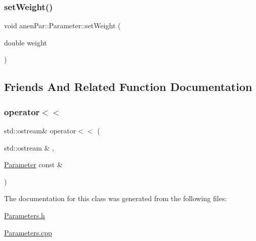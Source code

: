 \subsubsection{\texorpdfstring{set\+Weight()}{setWeight()}}
{\footnotesize\ttfamily void anen\+Par\+::\+Parameter\+::set\+Weight (\begin{DoxyParamCaption}\item[{double}]{weight }\end{DoxyParamCaption})}



\subsection{Friends And Related Function Documentation}
\mbox{\label{classanen_par_1_1_parameter_a062fa105b64c362071304bc5f2eb350a}} 
\subsubsection{\texorpdfstring{operator$<$$<$}{operator<<}}
{\footnotesize\ttfamily std\+::ostream\& operator$<$$<$ (\begin{DoxyParamCaption}\item[{std\+::ostream \&}]{,  }\item[{\mbox{\hyperlink{classanen_par_1_1_parameter}{Parameter}} const \&}]{ }\end{DoxyParamCaption})\hspace{0.3cm}{\ttfamily [friend]}}



The documentation for this class was generated from the following files\+:\begin{DoxyCompactItemize}
\item 
\mbox{\hyperlink{_parameters_8h}{Parameters.\+h}}\item 
\mbox{\hyperlink{_parameters_8cpp}{Parameters.\+cpp}}\end{DoxyCompactItemize}

